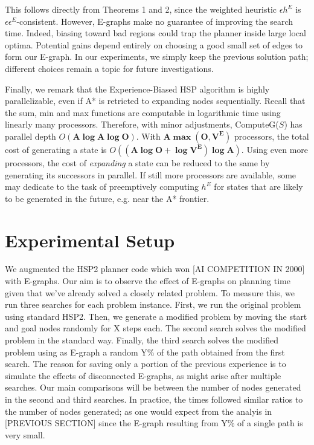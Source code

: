 \documentclass[letterpaper]{article}
\begin{document}
This follows directly from Theorems 1 and 2, since the weighted heuristic $\epsilon h^E$ is $\epsilon \epsilon^E$-consistent.
However, E-graphs make no guarantee of improving the search time. Indeed, biasing toward bad regions could trap the planner inside large local optima.
Potential gains depend entirely on choosing a good small set of edges to form our E-graph.
In our experiments, we simply keep the previous solution path; different choices remain a topic for future investigations.

Finally, we remark that the Experience-Biased HSP algorithm is highly parallelizable, even if A* is retricted to expanding nodes sequentially. Recall that the sum, min and max functions are computable in logarithmic time using linearly many processors. Therefore, with minor adjustments, ComputeG($S$) has parallel depth $O(\mathbf{A\log A\log O})$. With $\mathbf{A\max(O,V^E)}$ processors, the total cost of generating a state is $O(\mathbf{(A\log O + \log V^E)\log A})$. Using even more processors, the cost of \textit{expanding} a state can be reduced to the same by generating its successors in parallel. If still more processors are available, some may dedicate to the task of preemptively computing $h^E$ for states that are likely to be generated in the future, e.g. near the A* frontier.

\section{Experimental Setup}

We augmented the HSP2 planner code \cite{bonet2001planning} which won [AI COMPETITION IN 2000] with E-graphs. Our aim is to observe the effect of E-graphs on planning time given that we've already solved a closely related problem. To measure this, we run three searches for each problem instance. First, we run the original problem using standard HSP2. Then, we generate a modified problem by moving the start and goal nodes randomly for X steps each. The second search solves the modified problem in the standard way. Finally, the third search solves the modified problem using as E-graph a random Y\% of the path obtained from the first search. The reason for saving only a portion of the previous experience is to simulate the effects of disconnected E-graphs, as might arise after multiple searches. Our main comparisons will be between the number of nodes generated in the second and third searches. In practice, the times followed similar ratios to the number of nodes generated; as one would expect from the analyis in [PREVIOUS SECTION] since the E-graph resulting from Y\% of a single path is very small.
\end{document}
